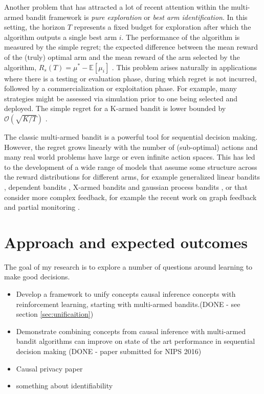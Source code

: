 \documentclass[11pt,a4paper]{article}
\newcommand{\E}[1]{\mathbb E\left[{#1}\right]}
\newcommand{\bigo}[1]{\mathcal{O}\left( #1 \right)}
\begin{document}
Another problem that has attracted a lot of recent attention \cite{Bubeck2009,Audibert2010,Gabillon2012,Karnin2013} within the multi-armed bandit framework is \textit{pure exploration} or \textit{best arm identification}. In this setting, the horizon $T$ represents a fixed budget for exploration after which the algorithm outputs a single best arm $i$. The performance of the algorithm is measured by the simple regret; the expected difference between the mean reward of the (truly) optimal arm and the mean reward of the arm selected by the algorithm, $R_s(T) = \mu^* - \E{\mu_i}$ . This problem arises naturally in applications where there is a testing or evaluation phase, during which regret is not incurred, followed by a commercialization or exploitation phase. For example, many strategies might be assessed via simulation prior to one being selected and deployed. The simple regret for a K-armed bandit is lower bounded by $\bigo{\sqrt{K/T}}$ \cite{Bubeck2009}.


The classic multi-armed bandit is a powerful tool for sequential decision making. However, the regret grows linearly with the number of (sub-optimal) actions and many real world problems have large or even infinite action spaces. This has led to the development of a wide range of models that assume some structure across the reward distributions for different arms, for example generalized linear bandits \cite{filippi2010parametric}, dependent bandits \cite{Pandey2007}, X-armed bandits \cite{Bubeck2010} and gaussian process bandits \cite{srinivas2009gaussian}, or that consider more complex feedback, for example the recent work on graph feedback \cite{Mannor2011,Lelarge2012,Alon2013,Buccapatnam2014,Kocak2014,Alon2015} and partial monitoring \cite{Piccolboni2001,Bartok2014}. 

\part{Approach and expected outcomes}

The goal of my research is to explore a number of questions around learning to make good decisions. 

\begin{itemize}
\item Develop a framework to unify concepts causal inference concepts with reinforcement learning, starting with multi-armed bandits.(DONE - see section \ref{sec:unificaition})
\item Demonstrate combining concepts from causal inference with multi-armed bandit algorithms can improve on state of the art performance in sequential decision making (DONE - paper submitted for NIPS 2016)
\item Causal privacy paper

\item something about identifiability
\end{itemize}
\end{document}
